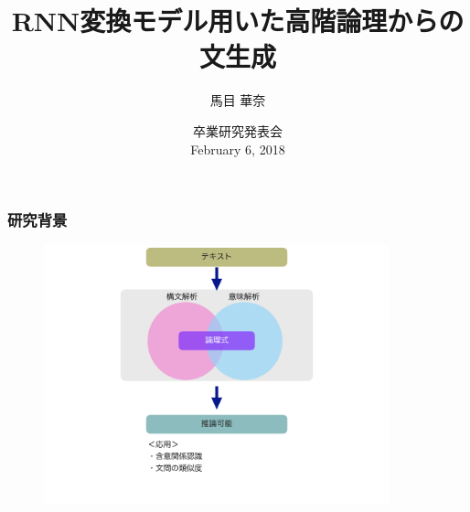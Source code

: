 \documentclass[dvipdfmx,cjk]{beamer}
\title{RNN変換モデル用いた高階論理からの文生成}
\author[]{馬目 華奈}
\institute{戸次研究室}
\date{
卒業研究発表会\\
February 6, 2018}
\begin{document}
\begin{frame}
  \titlepage
\end{frame}


\begin{frame}
\frametitle{研究背景}
\begin{center}
\begin{figure}[h]
	\includegraphics[width=10cm]{backend1.png}
        \label{fig:backend1}
\end{figure}
\end{center}


\end{frame}
\end{document}
